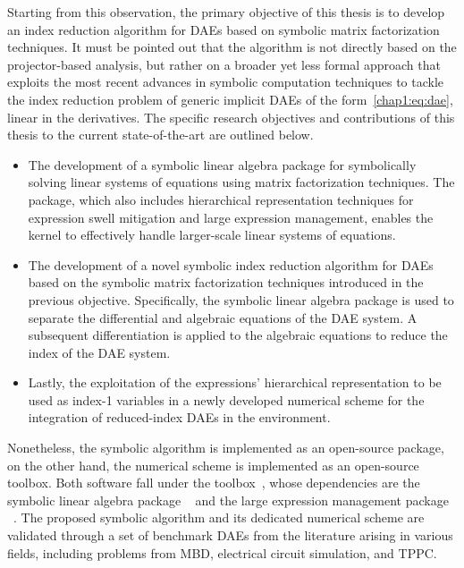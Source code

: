 Starting from this observation, the primary objective of this thesis is to develop an index reduction algorithm for \acp{DAE} based on symbolic matrix factorization techniques. It must be pointed out that the algorithm is not directly based on the projector-based analysis, but rather on a broader yet less formal approach that exploits the most recent advances in symbolic computation techniques to tackle the index reduction problem of generic implicit \acp{DAE} of the form~\eqref{chap1:eq:dae}, linear in the derivatives. The specific research objectives and contributions of this thesis to the current state-of-the-art are outlined below.
%
\begin{itemize}
  \item The development of a symbolic linear algebra package for symbolically solving linear systems of equations using matrix factorization techniques. The package, which also includes hierarchical representation techniques for expression swell mitigation and large expression management, enables the \Maple{} kernel to effectively handle larger-scale linear systems of equations.
  \item The development of a novel symbolic index reduction algorithm for \acp{DAE} based on the symbolic matrix factorization techniques introduced in the previous objective. Specifically, the symbolic linear algebra package is used to separate the differential and algebraic equations of the \ac{DAE} system. A subsequent differentiation is applied to the algebraic equations to reduce the index of the \ac{DAE} system.
  \item Lastly, the exploitation of the expressions' hierarchical representation to be used as index-1 variables in a newly developed numerical scheme for the integration of reduced-index \acp{DAE} in the \Matlab{} environment.
\end{itemize}
%
Nonetheless, the symbolic algorithm is implemented as an open-source \Maple{} package, on the other hand, the numerical scheme is implemented as an open-source \Matlab{} toolbox. Both software fall under the \Indigo{} toolbox~\cite{indigo}, whose dependencies are the symbolic linear algebra package \LAST{}~\cite{last} and the large expression management package \LEM{}~\cite{lem}. The proposed symbolic algorithm and its dedicated numerical scheme are validated through a set of benchmark \acp{DAE} from the literature arising in various fields, including problems from \ac{MBD}, electrical circuit simulation, and \ac{TPPC}.


